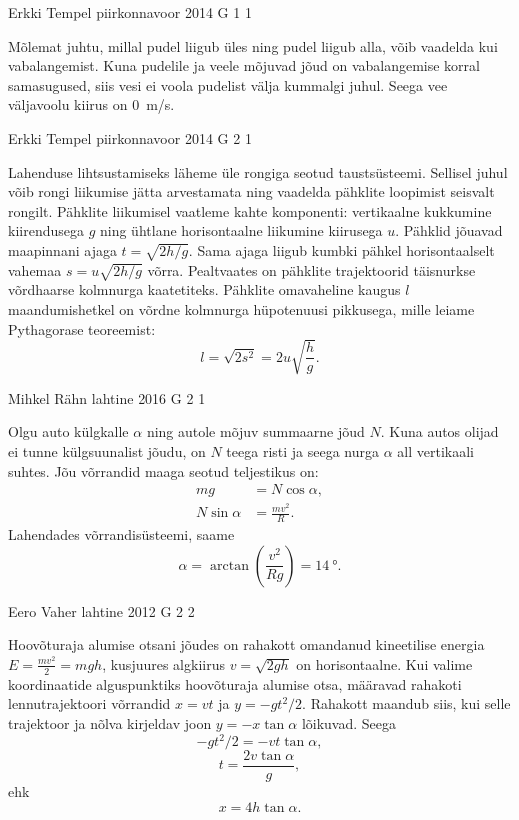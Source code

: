 \documentclass[11pt]{article}
\begin{document}
{%
{Erkki Tempel} %
{piirkonnavoor} %
{2014} %
{G 1} %
{1} %
{

\ifSolution
Mõlemat juhtu, millal pudel liigub üles ning pudel liigub alla, võib vaadelda kui vabalangemist. Kuna pudelile ja veele mõjuvad jõud on vabalangemise korral samasugused, siis vesi ei voola pudelist välja kummalgi juhul. Seega vee väljavoolu kiirus on \SI{0}{m/s}.
\fi
}

{Erkki Tempel} %
{piirkonnavoor} %
{2014} %
{G 2} %
{1} %
{

\ifSolution
Lahenduse lihtsustamiseks läheme üle rongiga seotud taustsüsteemi. Sellisel juhul võib rongi liikumise jätta arvestamata ning vaadelda pähklite loopimist seisvalt rongilt. Pähklite liikumisel vaatleme kahte komponenti: vertikaalne kukkumine kiirendusega $g$ ning ühtlane horisontaalne liikumine kiirusega $u$. Pähklid jõuavad maapinnani ajaga 
$t=\sqrt{2h/g}$.
Sama ajaga liigub kumbki pähkel horisontaalselt vahemaa $s=u\sqrt{2h/g}$ võrra. Pealtvaates on pähklite trajektoorid täisnurkse võrdhaarse kolmnurga kaatetiteks. Pähklite omavaheline kaugus $l$ maandumishetkel on võrdne kolmnurga hüpotenuusi pikkusega, mille leiame Pythagorase teoreemist:
\[ l=\sqrt{2s^2}=2u\sqrt{\frac{h}{g}}. \]
\fi
}

{Mihkel Rähn} %
{lahtine} %
{2016} %
{G 2} %
{1} %
{

\ifSolution
Olgu auto külgkalle $\alpha$ ning autole mõjuv summaarne jõud $N$. Kuna autos olijad ei tunne külgsuunalist jõudu, on $N$ teega risti ja seega nurga $\alpha$ all vertikaali suhtes. Jõu võrrandid maaga seotud teljestikus on:
\begin{align*}
mg &= N\cos \alpha,\\
N\sin\alpha &= \frac{mv^2}{R}.
\end{align*}
Lahendades võrrandisüsteemi, saame
\[
\alpha = \arctan\left(\frac{v^2}{Rg}\right) = \SI{14}{\degree}.
\]
\fi
}

{Eero Vaher} %
{lahtine} %
{2012} %
{G 2} %
{2} %
{

\ifSolution
Hoovõturaja alumise otsani jõudes on rahakott omandanud kineetilise energia $E=\frac{mv^2}{2}=mgh$, kusjuures algkiirus $v=\sqrt{2gh}$ on horisontaalne. Kui valime koordinaatide alguspunktiks hoovõturaja alumise otsa, määravad rahakoti lennutrajektoori võrrandid $x=vt$ ja $y=-gt^2 / 2$. Rahakott maandub siis, kui selle trajektoor ja nõlva kirjeldav joon $y=-x\tan\alpha$ lõikuvad. Seega 
$$-gt^2 / 2=-vt\tan\alpha,$$ 
$$t=\frac{2v \tan \alpha}{g},$$ 
ehk
$$x=4h \tan\alpha.$$
\fi
}

}
\end{document}

